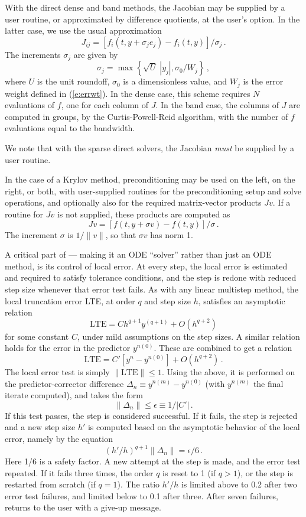 With the direct dense and band methods, the Jacobian may be supplied
by a user routine, or approximated by difference quotients,
at the user's option.  In the latter case, we use the usual
approximation
\[ J_{ij} = [f_i(t,y+\sigma_j e_j) - f_i(t,y)]/\sigma_j \, . \]
The increments $\sigma_j$ are given by
\[ \sigma_j = \max\left\{\sqrt{U} \; |y_j| , \sigma_0 / W_j \right\} \, , \]
where $U$ is the unit roundoff, $\sigma_0$ is a dimensionless value,
and $W_j$ is the error weight defined in (\ref{e:errwt}).  In the dense
case, this scheme requires $N$ evaluations of $f$, one for each column
of $J$.  In the band case, the columns of $J$ are computed in groups,
by the Curtis-Powell-Reid algorithm, with the number of $f$ evaluations
equal to the bandwidth.

We note that with the sparse direct solvers, the Jacobian {\em must}
be supplied by a user routine.

In the case of a Krylov method, preconditioning may be used on the left, on the
right, or both, with user-supplied routines for the preconditioning
setup and solve operations, and optionally also for the required
matrix-vector products $Jv$.  If a routine for $Jv$ is not supplied,
these products are computed as
\begin{equation}\label{jacobv}
Jv = [f(t,y+\sigma v) - f(t,y)]/\sigma \, . 
\end{equation}
The increment $\sigma$ is $1/\|v\|$, so that $\sigma v$ has norm 1.

A critical part of {\cvodes} --- making it an ODE ``solver'' rather than
just an ODE method, is its control of local error.  At every step, the
local error is estimated and required to satisfy tolerance conditions,
and the step is redone with reduced step size whenever that error test
fails.  As with any linear multistep method, the local truncation
error LTE, at order $q$ and step size $h$, satisfies an asymptotic
relation
\[ \mbox{LTE} = C h^{q+1} y^{(q+1)} + O(h^{q+2}) \]
for some constant $C$, under mild assumptions on the step sizes.
A similar relation holds for the error in the predictor $y^{n(0)}$.
These are combined to get a relation
\[ \mbox{LTE} = C' [y^n - y^{n(0)}] + O(h^{q+2}) \, . \]
The local error test is simply $\|\mbox{LTE}\| \leq 1$.  Using the above,
it is performed on the predictor-corrector difference 
$\Delta_n \equiv y^{n(m)} - y^{n(0)}$ (with $y^{n(m)}$ the final
iterate computed), and takes the form
\[ \|\Delta_n\| \leq \epsilon \equiv 1/|C'| \, . \]
If this test passes, the step is considered successful.  If it fails,
the step is rejected and a new step size $h'$ is computed based on the
asymptotic behavior of the local error, namely by the equation
\[ (h'/h)^{q+1} \|\Delta_n\| = \epsilon/6 \, . \]
Here 1/6 is a safety factor.  A new attempt at the step is made,
and the error test repeated.  If it fails three times, the order $q$
is reset to 1 (if $q > 1$), or the step is restarted from scratch (if
$q = 1$).  The ratio $h'/h$ is limited above to 0.2 after two error test
failures, and limited below to 0.1 after three.  After seven failures,
{\cvodes} returns to the user with a give-up message.

